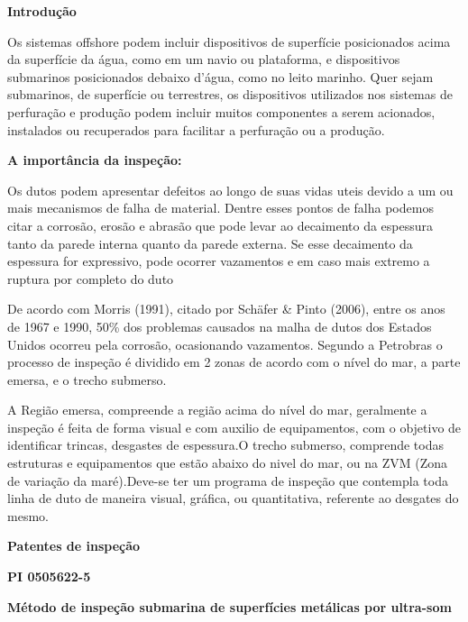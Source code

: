 \documentclass[a4paper,12pt]{article}
\begin{document}
	 
	
\hspace{-0,75cm}
\textbf{Introdução}
\vspace{1,0cm}


Os sistemas offshore podem incluir dispositivos de superfície
posicionados acima da superfície da água, como em um navio ou plataforma, e
dispositivos submarinos posicionados debaixo d'água, como no leito marinho. Quer sejam submarinos, de superfície ou terrestres, os dispositivos utilizados nos
sistemas de perfuração e produção podem incluir muitos componentes a serem
acionados, instalados ou recuperados para facilitar a perfuração ou a produção.

\vspace{1,0cm}
\hspace{-0,75cm}
\textbf{A importância da inspeção:}
\vspace{1,0cm}

Os dutos podem apresentar defeitos ao longo de suas vidas uteis devido a um ou mais
mecanismos de falha de material. Dentre esses pontos de falha podemos citar a corrosão, erosão e
abrasão que pode levar ao decaimento da espessura tanto da parede interna quanto da parede externa.
Se esse decaimento da espessura for expressivo, pode ocorrer vazamentos e em caso mais extremo a
ruptura por completo do duto

De acordo com Morris (1991), citado por Schäfer \& Pinto (2006), entre os anos de 1967 e 1990,
50\% dos problemas causados na malha de dutos dos Estados Unidos ocorreu pela corrosão, ocasionando
vazamentos.
Segundo a Petrobras o processo de inspeção é dividido em 2 zonas de acordo com o nível do mar, a parte emersa, e o trecho submerso.

A Região emersa, compreende a região acima do nível do mar, geralmente a inspeção é feita de forma visual e com auxilio de equipamentos, com o objetivo de identificar trincas, desgastes de espessura.O trecho submerso, comprende todas estruturas e equipamentos que estão abaixo do nivel do mar, ou na ZVM (Zona de variação da maré).Deve-se ter um programa de inspeção que contempla toda linha de duto de maneira visual, gráfica, ou quantitativa, referente ao desgates do mesmo.

\vspace{1,0cm}
\hspace{-0,75cm}
 \textbf{Patentes de inspeção}
 
 \vspace{1,0cm}
 \begin{center}
  \textbf{PI 0505622-5} 
 
 \textbf{Método de inspeção submarina de superfícies metálicas por ultra-som}
 \end{center}
 
\end{document}
